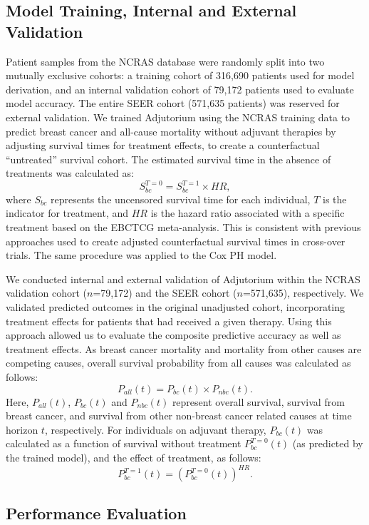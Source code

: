 \documentclass [PhD] {uclathes}
\begin{document}
\subsection*{Model Training, Internal and External Validation}
Patient samples from the NCRAS database were randomly split into two mutually exclusive cohorts: a training cohort of 316,690 patients used for model derivation, and an internal validation cohort of 79,172 patients used to evaluate model accuracy. The entire SEER cohort (571,635 patients) was reserved for external validation. We trained Adjutorium using the NCRAS training data to predict breast cancer and all-cause mortality without adjuvant therapies by adjusting survival times for treatment effects, to create a counterfactual ``untreated'' survival cohort. The estimated survival time in the absence of treatments was calculated as:
\[S^{T=0}_{bc} = S^{T=1}_{bc} \times HR,\]
where $S_{bc}$ represents the uncensored survival time for each individual, $T$ is the indicator for treatment, and $HR$ is the hazard ratio associated with a specific treatment based on the EBCTCG meta-analysis.\cite{early2012comparisons} This is consistent with previous approaches used to create adjusted counterfactual survival times in cross-over trials.\cite{latimer2019two} The same procedure was applied to the Cox PH model.

We conducted internal and external validation of Adjutorium within the NCRAS validation cohort ($n$=79,172) and the SEER cohort ($n$=571,635), respectively. We validated predicted outcomes in the original unadjusted cohort, incorporating treatment effects for patients that had received a given therapy. Using this approach allowed us to evaluate the composite predictive accuracy as well as treatment effects. As breast cancer mortality and mortality from other causes are competing causes, overall survival probability from all causes was calculated as follows:
\[P_{all}(t) = P_{bc}(t) \times P_{nbc}(t).\]
Here, $P_{all}(t)$, $P_{bc}(t)$ and $P_{nbc}(t)$ represent overall survival, survival from breast cancer, and survival from other non-breast cancer related causes at time horizon $t$, respectively. For individuals on adjuvant therapy, $P_{bc}(t)$ was calculated as a function of survival without treatment $P^{T=0}_{bc}(t)$ (as predicted by the trained model), and the effect of treatment, as follows:
\[P^{T=1}_{bc}(t) = \left(P^{T=0}_{bc}(t)\right)^{HR}.\]

\subsection*{Performance Evaluation}
\end{document}
